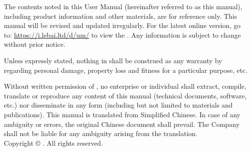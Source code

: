 \thispagestyle{empty}
{
\small

The contents noted in this User Manual (hereinafter referred to as this manual), including product information and other materials, are for reference only. This manual will be revised and updated irregularly. For the latest online version, go to: \url{https://i.lebai.ltd/d/um/} to view the {\eBook}. Any information is subject to change without prior notice.

Unless expressly stated, nothing in {\ThisBook} shall be construed as any warranty by {\Company} regarding personal damage, property loss and fitness for a particular purpose, etc.

Without written permission of {\Company}, no enterprise or individual shall extract, compile, translate or reproduce any content of this manual (technical documents, software, etc.) nor disseminate {\ThisBook} in any form (including but not limited to materials and publications).
This manual is translated from Simplified Chinese. In case of any ambiguity or errors, the original Chinese document shall prevail. The Company shall not be liable for any ambiguity arising from the translation.\\

Copyright © {\Company}. All rights reserved.
}